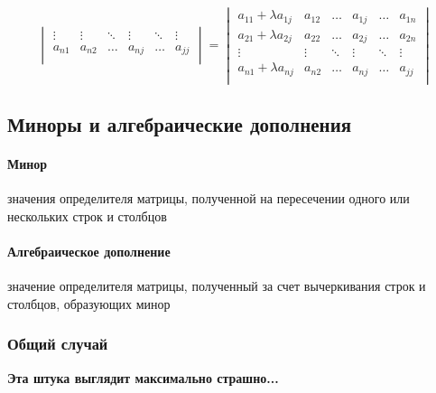 \documentclass[class=article,a4paper,12pt,crop=false]{standalone}
\begin{document}
\begin{enumerate}
{\begin{equation}
\begin{vmatrix}
        \vdots & \vdots & \ddots & \vdots & \ddots & \vdots \\
        a_{n1} & a_{n2} & \dots & a_{nj} & \dots & a_{jj} \\
      \end{vmatrix}
      =
      \begin{vmatrix}
        a_{11} + \lambda a_{1j} & a_{12} & \dots & a_{1j} & \dots & a_{1n} \\
        a_{21} + \lambda a_{2j} & a_{22} & \dots & a_{2j} & \dots & a_{2n} \\
        \vdots & \vdots & \ddots & \vdots & \ddots & \vdots \\
        a_{n1} + \lambda a_{nj} & a_{n2} & \dots & a_{nj} & \dots & a_{jj} \\
      \end{vmatrix}
    \end{equation}
  }
\end{enumerate}

\subsection{Миноры и алгебраические дополнения}

\paragraph{Минор} значения определителя матрицы, полученной на пересечении одного или нескольких строк и столбцов
\paragraph{Алгебраическое дополнение} значение определителя матрицы, полученный за счет вычеркивания строк и столбцов, образующих минор

\subsubsection{Общий случай}

\textbf{Эта штука выглядит максимально страшно...}
\end{document}
